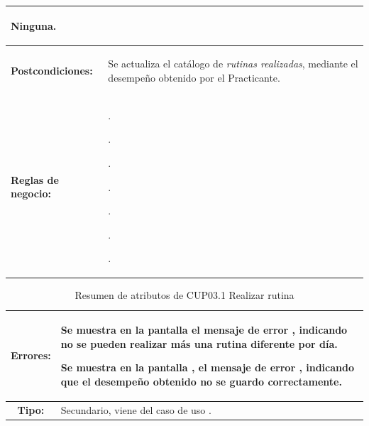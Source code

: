 \begin{table}[H]
\begin{tabular}{| l | p{12 cm} |}
							\begin{compactitem}
								\setlength\itemsep{-0.25em}
								\item Ninguna.
							\end{compactitem}\\
\hline
\textbf{Postcondiciones:} & \vspace{-2mm}	%
							\begin{compactitem}
								\item Se actualiza el catálogo de \textit{rutinas realizadas}, mediante el desempeño obtenido por el Practicante.
							\end{compactitem}\\
							
\hline
\textbf{Reglas de negocio:} & \vspace{-2mm}	%
							\begin{compactitem}
								\item \nameref{rn:RND03}.
								\item \nameref{rn:RNR21}.
								\item \nameref{rn:RNR22}.
								\item \nameref{rn:RNR29}.
								\item \nameref{rn:RNR30}.
								\item \nameref{rn:RNR39}.
								\item \nameref{rn:RNR40}.
							\end{compactitem}\\							
\hline
\end{tabular}
\end{table} 

\clearpage

\begin{table}[H]
\centering
\begin{tabular}{| c | p{14 cm} |}
\hline
\textbf{Errores:} &	\vspace{-2mm}	%
					\begin{compactitem}
						\setlength\itemsep{-0.25em}
						\item Se muestra en la pantalla \nameref{pant:IUP03} el mensaje de error \nameref{msj:MSG19}, indicando no se pueden realizar más una rutina diferente por día.
						\item Se muestra en la pantalla \nameref{pant:IUP03.1}, el mensaje de error \nameref{msj:MSG25}, indicando que el desempeño obtenido no se guardo correctamente.
					\end{compactitem}\\
\hline
\textbf{Tipo:} & Secundario, viene del caso de uso \nameref{cu:CUP03}.\\
\hline	
\end{tabular}
\caption{Resumen de atributos de CUP03.1 Realizar rutina}
\label{tab:CUP03.1}
\end{table} 

